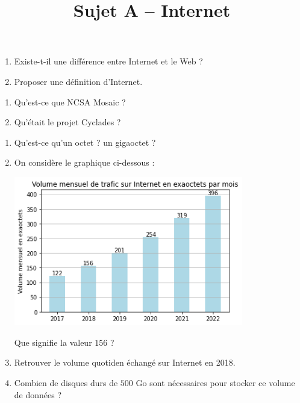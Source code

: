 \documentclass[a4paper]{article}
\begin{document}
\title{Sujet A -- Internet}

\pagestyle{empty}

\date{}
\author{}

\maketitle{}
\thispagestyle{empty}

\exo[2 points]\vspace*{-2mm}
\begin{enumerate}
  \item Existe-t-il une différence entre Internet et le Web ?
  \item Proposer une définition d'Internet.
\end{enumerate}

\bigskip

\exo[3 points]\vspace*{-2mm}
\begin{enumerate}
  \item Qu'est-ce que NCSA Mosaic ?
  \item Qu'était le projet Cyclades ?
\end{enumerate}

\bigskip

\exo[6 points]\vspace*{-2mm}
\begin{enumerate}
  \item Qu'est-ce qu'un octet ? un gigaoctet ?
  \item On considère le graphique ci-dessous : 
   \begin{center}
     \includegraphics[width=10cm]{volume.png}
   \end{center} 
   Que signifie la valeur $156$ ?
  \item Retrouver le volume quotiden échangé sur Internet en 2018.
  \item Combien de disques durs de $500$ Go sont nécessaires pour stocker ce volume de données ?
\end{enumerate}
\end{document}
